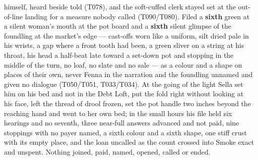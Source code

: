 \documentclass{design/chronicle}
\begin{document}
{\begin{itemize}[leftmargin=1.4em,itemsep=1pt,topsep=3pt,parsep=0pt]
himself, heard beside told (T078), and the soft-cuffed clerk stayed set at the out-of-line landing for a measure nobody called (T090/T080). Filed a \textbf{sixth} green at a silent woman’s mouth at the pot board and a \textbf{sixth} silent glimpse of the foundling at the market’s edge — cast-offs worn like a uniform, silt dried pale in his wrists, a gap where a front tooth had been, a green sliver on a string at his throat, his head a half-beat late toward a set-down pot and stopping in the middle of the turn, no loaf, no slate and no sale — as a colour and a shape on places of their own, never Fenna in the narration and the foundling unnamed and given no dialogue (T050/T051, T033/T034). At the going of the light Sella set him on his bed and not in the Debt Loft, put the fold right without looking at his face, left the thread of drool frozen, set the pot handle two inches beyond the reaching hand and went to her own bed; in the small hours his file held six hearings and no seventh, three near-full answers advanced and not paid, nine stoppings with no payer named, a sixth colour and a sixth shape, one stiff crust with its empty place, and the loan uncalled as the count crossed into Smoke exact and unspent. Nothing joined, paid, named, opened, called or ended.

\end{itemize}

\begin{itemize}[leftmargin=1.4em,itemsep=1pt,topsep=3pt,parsep=0pt]


\end{itemize}}
\end{document}
